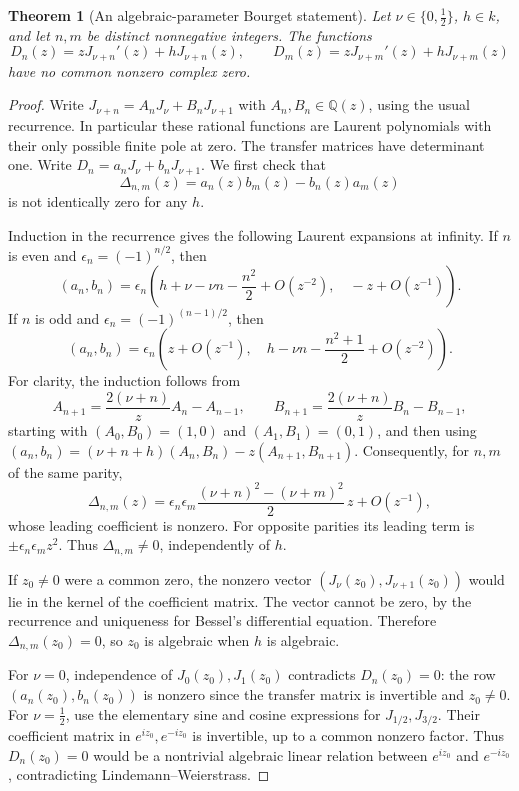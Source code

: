 \documentclass[11pt]{article}
\newtheorem{theorem}{Theorem}[section]
\theoremstyle{definition}
\theoremstyle{remark}
\begin{document}
\begin{theorem}[An algebraic-parameter Bourget statement]
\label{sp:bourget}
Let $\nu\in\{0,\tfrac12\}$, $h\in k$, and let $n,m$ be distinct
nonnegative integers.  The functions
\[
 D_n(z)=zJ_{\nu+n}'(z)+hJ_{\nu+n}(z),\qquad
 D_m(z)=zJ_{\nu+m}'(z)+hJ_{\nu+m}(z)
\]
have no common nonzero complex zero.
\end{theorem}
\begin{proof}
Write $J_{\nu+n}=A_nJ_\nu+B_nJ_{\nu+1}$ with
$A_n,B_n\in\mathbb Q(z)$, using the usual recurrence.
In particular these rational functions are Laurent polynomials with
their only possible finite pole at zero.  The transfer matrices have
determinant one.  Write
$D_n=a_nJ_\nu+b_nJ_{\nu+1}$.
We first check that
\[
 \Delta_{n,m}(z)=a_n(z)b_m(z)-b_n(z)a_m(z)
\]
is not identically zero for any $h$.

Induction in the recurrence gives the following Laurent expansions at
infinity.  If $n$ is even and $\epsilon_n=(-1)^{n/2}$, then
\[
 (a_n,b_n)=\epsilon_n\left(
 h+\nu-\nu n-\frac{n^2}{2}+O(z^{-2}),\quad
 -z+O(z^{-1})\right).
\]
If $n$ is odd and $\epsilon_n=(-1)^{(n-1)/2}$, then
\[
 (a_n,b_n)=\epsilon_n\left(
 z+O(z^{-1}),\quad h-\nu n-\frac{n^2+1}{2}+O(z^{-2})\right).
\]
For clarity, the induction follows from
\[
 A_{n+1}=\frac{2(\nu+n)}z A_n-A_{n-1},\qquad
 B_{n+1}=\frac{2(\nu+n)}z B_n-B_{n-1},
\]
starting with $(A_0,B_0)=(1,0)$ and $(A_1,B_1)=(0,1)$, and then using
$(a_n,b_n)=(\nu+n+h)(A_n,B_n)-z(A_{n+1},B_{n+1})$.
Consequently, for $n,m$ of the same parity,
\[
 \Delta_{n,m}(z)=\epsilon_n\epsilon_m
 \frac{(\nu+n)^2-(\nu+m)^2}{2}\,z+O(z^{-1}),
\]
whose leading coefficient is nonzero.  For opposite parities its
leading term is $\pm\epsilon_n\epsilon_m z^2$.
Thus $\Delta_{n,m}\ne0$, independently of $h$.

If $z_0\ne0$ were a common zero, the nonzero vector
$(J_\nu(z_0),J_{\nu+1}(z_0))$ would lie in the kernel of the coefficient
matrix.  The vector cannot be zero, by the recurrence and uniqueness
for Bessel's differential equation.  Therefore
$\Delta_{n,m}(z_0)=0$, so $z_0$ is algebraic when $h$ is algebraic.

For $\nu=0$, independence of $J_0(z_0),J_1(z_0)$ contradicts
$D_n(z_0)=0$: the row $(a_n(z_0),b_n(z_0))$ is nonzero since the
transfer matrix is invertible and $z_0\ne0$.
For $\nu=\tfrac12$, use the elementary sine and cosine expressions
for $J_{1/2},J_{3/2}$.  Their coefficient matrix in
$e^{iz_0},e^{-iz_0}$ is invertible, up to a common nonzero factor.
Thus $D_n(z_0)=0$ would be a nontrivial algebraic linear relation
between $e^{iz_0}$ and $e^{-iz_0}$, contradicting
Lindemann--Weierstrass.
\end{proof}
\end{document}

